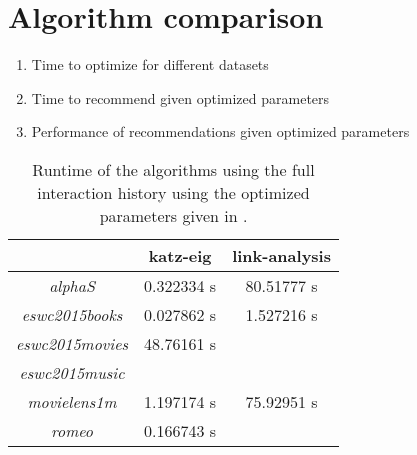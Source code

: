 
\section{Algorithm comparison}


\begin{enumerate}
    \item Time to optimize for different datasets
    \item Time to recommend given optimized parameters
    \item Performance of recommendations given optimized parameters
\end{enumerate}


\begin{table}[h!]
    \centering
    \begin{tabular}{| c | c | c | }
        \hline
        \textbf{}               & \textbf{katz-eig} & \textbf{link-analysis} \\ \hline
        \textit{alphaS}         & 0.322334 s        & 80.51777 s             \\ \hline
        \textit{eswc2015books}  & 0.027862 s        & 1.527216 s             \\ \hline
        \textit{eswc2015movies} & 48.76161 s        &                        \\ \hline
        \textit{eswc2015music}  &                   &                        \\ \hline
        \textit{movielens1m}    & 1.197174 s        & 75.92951 s             \\ \hline
        \textit{romeo}          & 0.166743 s        &                        \\ \hline
    \end{tabular}
    \caption{Runtime of the algorithms using the full interaction history using the optimized parameters given in .}
    \label{tab:alg_full_time}
\end{table}

